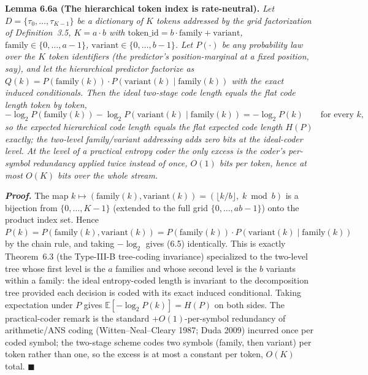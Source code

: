 \documentclass[
]{article}
\begin{document}
\textbf{Lemma 6.6a (The hierarchical token index is rate-neutral).}
\emph{Let $D = \{\tau_0, \ldots, \tau_{K-1}\}$ be a dictionary of $K$
tokens addressed by the grid factorization of Definition~3.5, $K = a
\cdot b$ with $\mathrm{token\_id} = b \cdot \mathrm{family} +
\mathrm{variant}$, $\mathrm{family} \in \{0,\ldots,a-1\}$,
$\mathrm{variant} \in \{0,\ldots,b-1\}$. Let $P(\cdot)$ be any
probability law over the $K$ token identifiers (the predictor's
position-marginal at a fixed position, say), and let the hierarchical
predictor factorize as
$Q(k) = P(\mathrm{family}(k)) \cdot P(\mathrm{variant}(k) \mid
\mathrm{family}(k))$ with the \emph{exact} induced conditionals. Then
the ideal two-stage code length equals the flat code length token by
token,}
\[
-\log_2 P(\mathrm{family}(k)) - \log_2 P(\mathrm{variant}(k) \mid \mathrm{family}(k))
= -\log_2 P(k) \qquad \text{for every } k,
\tag{6.5}
\]
\emph{so the expected hierarchical code length equals the flat
expected code length $H(P)$ exactly; the two-level family/variant
addressing adds zero bits at the ideal-coder level. At the level of a
practical entropy coder the only excess is the coder's per-symbol
redundancy applied twice instead of once, $O(1)$ bits per token, hence
at most $O(K)$ bits over the whole stream.}

\emph{\textbf{Proof.}} The map $k \mapsto (\mathrm{family}(k),
\mathrm{variant}(k)) = (\lfloor k/b \rfloor, \; k \bmod b)$ is a
bijection from $\{0,\ldots,K-1\}$ (extended to the full grid
$\{0,\ldots,ab-1\}$) onto the product index set. Hence
$P(k) = P(\mathrm{family}(k), \mathrm{variant}(k)) = P(\mathrm{family}(k))
\cdot P(\mathrm{variant}(k) \mid \mathrm{family}(k))$ by the chain
rule, and taking $-\log_2$ gives (6.5) identically. This is exactly
Theorem~6.3 (the Type-III-B tree-coding invariance) specialized to the
two-level tree whose first level is the $a$ families and whose second
level is the $b$ variants within a family: the ideal entropy-coded
length is invariant to the decomposition tree provided each decision
is coded with its exact induced conditional. Taking expectation under
$P$ gives $\mathbb{E}[-\log_2 P(k)] = H(P)$ on both sides. The
practical-coder remark is the standard $+O(1)$-per-symbol redundancy
of arithmetic/ANS coding (Witten--Neal--Cleary 1987; Duda 2009)
incurred once per coded symbol; the two-stage scheme codes two symbols
(family, then variant) per token rather than one, so the excess is at
most a constant per token, $O(K)$ total. \hfill$\blacksquare$
\end{document}
